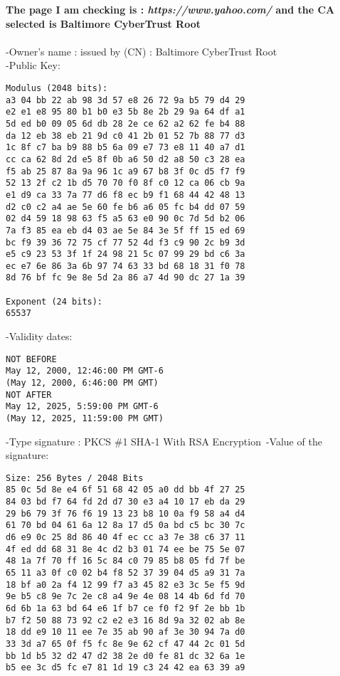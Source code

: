 \documentclass[12pt]{article}
\begin{document}
\begin{enumerate}
\begin{enumerate}
\textbf{ The page I am checking is : \textit{https://www.yahoo.com/} and the CA selected is Baltimore CyberTrust Root } \\\\
-Owner's name :   issued by (CN) : Baltimore CyberTrust Root \\
-Public Key: 
\begin{verbatim}
Modulus (2048 bits):
a3 04 bb 22 ab 98 3d 57 e8 26 72 9a b5 79 d4 29 
e2 e1 e8 95 80 b1 b0 e3 5b 8e 2b 29 9a 64 df a1 
5d ed b0 09 05 6d db 28 2e ce 62 a2 62 fe b4 88 
da 12 eb 38 eb 21 9d c0 41 2b 01 52 7b 88 77 d3 
1c 8f c7 ba b9 88 b5 6a 09 e7 73 e8 11 40 a7 d1 
cc ca 62 8d 2d e5 8f 0b a6 50 d2 a8 50 c3 28 ea 
f5 ab 25 87 8a 9a 96 1c a9 67 b8 3f 0c d5 f7 f9 
52 13 2f c2 1b d5 70 70 f0 8f c0 12 ca 06 cb 9a 
e1 d9 ca 33 7a 77 d6 f8 ec b9 f1 68 44 42 48 13 
d2 c0 c2 a4 ae 5e 60 fe b6 a6 05 fc b4 dd 07 59 
02 d4 59 18 98 63 f5 a5 63 e0 90 0c 7d 5d b2 06 
7a f3 85 ea eb d4 03 ae 5e 84 3e 5f ff 15 ed 69 
bc f9 39 36 72 75 cf 77 52 4d f3 c9 90 2c b9 3d 
e5 c9 23 53 3f 1f 24 98 21 5c 07 99 29 bd c6 3a 
ec e7 6e 86 3a 6b 97 74 63 33 bd 68 18 31 f0 78 
8d 76 bf fc 9e 8e 5d 2a 86 a7 4d 90 dc 27 1a 39 

Exponent (24 bits):
65537
\end{verbatim}
-Validity dates: 
\begin{verbatim}
NOT BEFORE
May 12, 2000, 12:46:00 PM GMT-6
(May 12, 2000, 6:46:00 PM GMT)
NOT AFTER
May 12, 2025, 5:59:00 PM GMT-6
(May 12, 2025, 11:59:00 PM GMT)
\end{verbatim}

-Type signature : PKCS \#1 SHA-1 With RSA Encryption\
-Value of the signature:
\begin{verbatim}
Size: 256 Bytes / 2048 Bits
85 0c 5d 8e e4 6f 51 68 42 05 a0 dd bb 4f 27 25 
84 03 bd f7 64 fd 2d d7 30 e3 a4 10 17 eb da 29 
29 b6 79 3f 76 f6 19 13 23 b8 10 0a f9 58 a4 d4 
61 70 bd 04 61 6a 12 8a 17 d5 0a bd c5 bc 30 7c 
d6 e9 0c 25 8d 86 40 4f ec cc a3 7e 38 c6 37 11 
4f ed dd 68 31 8e 4c d2 b3 01 74 ee be 75 5e 07 
48 1a 7f 70 ff 16 5c 84 c0 79 85 b8 05 fd 7f be 
65 11 a3 0f c0 02 b4 f8 52 37 39 04 d5 a9 31 7a 
18 bf a0 2a f4 12 99 f7 a3 45 82 e3 3c 5e f5 9d 
9e b5 c8 9e 7c 2e c8 a4 9e 4e 08 14 4b 6d fd 70 
6d 6b 1a 63 bd 64 e6 1f b7 ce f0 f2 9f 2e bb 1b 
b7 f2 50 88 73 92 c2 e2 e3 16 8d 9a 32 02 ab 8e 
18 dd e9 10 11 ee 7e 35 ab 90 af 3e 30 94 7a d0 
33 3d a7 65 0f f5 fc 8e 9e 62 cf 47 44 2c 01 5d 
bb 1d b5 32 d2 47 d2 38 2e d0 fe 81 dc 32 6a 1e 
b5 ee 3c d5 fc e7 81 1d 19 c3 24 42 ea 63 39 a9 


\end{verbatim}
\end{enumerate}
\end{enumerate}
\end{document}
